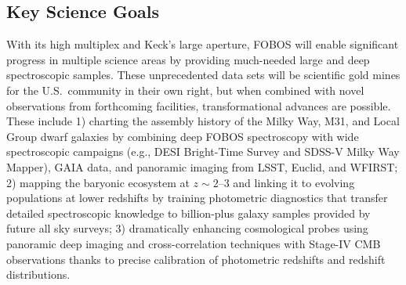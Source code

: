 

\subsection{Key Science Goals}

With its high multiplex and Keck's large aperture, FOBOS will enable significant progress in multiple science areas by
providing much-needed large and deep spectroscopic samples.  These unprecedented data sets will be scientific gold
mines for the U.S.~community in their own right, but when combined with novel observations from forthcoming facilities,
transformational advances are possible.  These include 1) charting the assembly history of the Milky Way, M31, and
Local Group dwarf galaxies by combining deep FOBOS spectroscopy with wide spectroscopic campaigns (e.g., DESI
Bright-Time Survey and SDSS-V Milky Way Mapper), GAIA data, and panoramic imaging from LSST, Euclid, and WFIRST; 2)
mapping the baryonic ecosystem at $z \sim 2$--3 and linking it to evolving populations at lower redshifts by training
photometric diagnostics that transfer detailed spectroscopic knowledge to billion-plus galaxy samples provided by
future all sky surveys; 3) dramatically enhancing cosmological probes using panoramic deep imaging and
cross-correlation techniques with Stage-IV CMB observations thanks to precise calibration of photometric redshifts and
redshift distributions.


